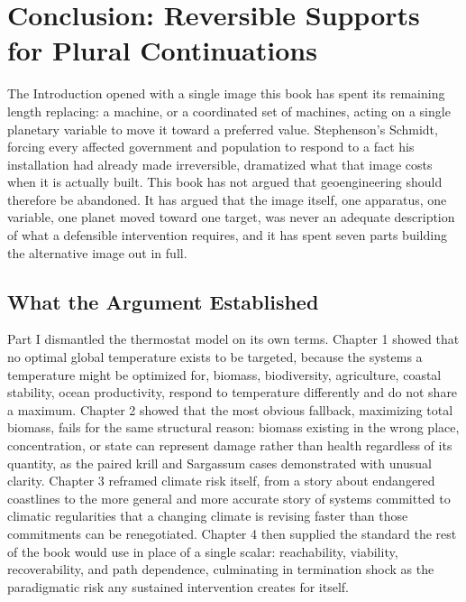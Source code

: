 \documentclass[11pt,oneside]{book}
\begin{document}
\chapter*{Conclusion: Reversible Supports for Plural Continuations}

The Introduction opened with a single image this book has spent its remaining length replacing: a machine, or a coordinated set of machines, acting on a single planetary variable to move it toward a preferred value. Stephenson's Schmidt, forcing every affected government and population to respond to a fact his installation had already made irreversible, dramatized what that image costs when it is actually built. This book has not argued that geoengineering should therefore be abandoned. It has argued that the image itself, one apparatus, one variable, one planet moved toward one target, was never an adequate description of what a defensible intervention requires, and it has spent seven parts building the alternative image out in full.

\section*{What the Argument Established}

Part I dismantled the thermostat model on its own terms. Chapter 1 showed that no optimal global temperature exists to be targeted, because the systems a temperature might be optimized for, biomass, biodiversity, agriculture, coastal stability, ocean productivity, respond to temperature differently and do not share a maximum. Chapter 2 showed that the most obvious fallback, maximizing total biomass, fails for the same structural reason: biomass existing in the wrong place, concentration, or state can represent damage rather than health regardless of its quantity, as the paired krill and Sargassum cases demonstrated with unusual clarity. Chapter 3 reframed climate risk itself, from a story about endangered coastlines to the more general and more accurate story of systems committed to climatic regularities that a changing climate is revising faster than those commitments can be renegotiated. Chapter 4 then supplied the standard the rest of the book would use in place of a single scalar: reachability, viability, recoverability, and path dependence, culminating in termination shock as the paradigmatic risk any sustained intervention creates for itself.
\end{document}
